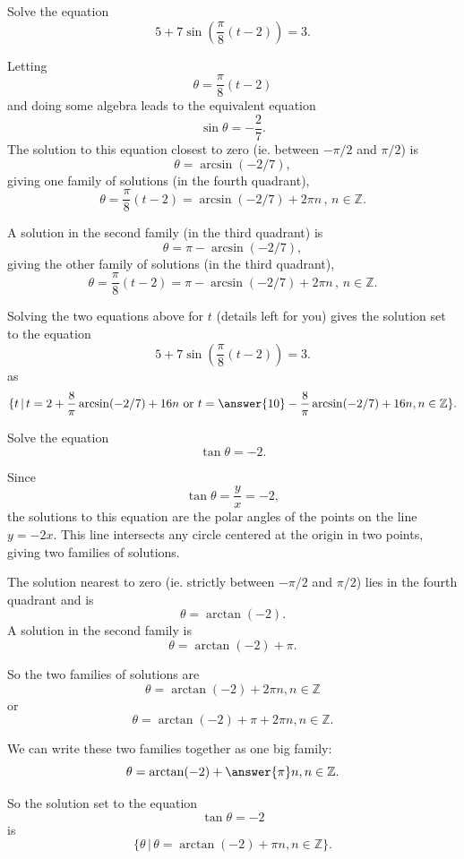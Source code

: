\documentclass{ximera}
\begin{document}
\begin{example} \label{Exlfeef}
Solve the equation
\[
  5 + 7 \sin \left( \frac{\pi}{8}\left( t-2 \right)  \right) =  3 .
\]

\begin{explanation}
Letting 
\[
   \theta = \frac{\pi}{8}\left( t-2 \right)
\]
and doing some algebra leads to the equivalent equation
\[
 \sin\theta = -\frac{2}{7}.
\]
The solution to this equation closest to zero (ie. between $-\pi/2$ and $\pi/2$) is
\[
    \theta = \arcsin(-2/7),
\]
giving one family of solutions (in the fourth quadrant),
\[
  \theta = \frac{\pi}{8}\left( t-2 \right) = \arcsin(-2/7) + 2\pi n \, , \, n \in \mathbb{Z}.
\]

A solution in the second family (in the third quadrant) is
\[
  \theta =  \pi - \arcsin(-2/7),
\]
giving the other family of solutions (in the third quadrant),
\[
  \theta = \frac{\pi}{8}\left( t-2 \right) = \pi - \arcsin(-2/7) + 2\pi n \, , \, n \in \mathbb{Z}.
\]

Solving the two equations above for $t$ (details left for you) gives the solution set to the equation
\[
  5 + 7 \sin \left( \frac{\pi}{8}\left( t-2 \right)  \right) =  3 .
\]
as
\[
     \{  t \, | \, t = 2 + \frac{8}{\pi} \arcsin(-2/7) + 16n  \text{ or } t= \answer{10} - \frac{8}{\pi} \arcsin(-2/7) + 16n ,n\in \mathbb{Z}     \}.
\]
\end{explanation}
\end{example}

\begin{example} \label{Ex93r93r}
Solve the equation
\[
     \tan \theta = -2 .
\]

\begin{explanation}
Since
\[
  \tan\theta = \frac{y}{x} = -2,
\]
the solutions to this equation are the polar angles of the points on the line $y=-2x$. This line intersects any circle centered at the origin in two points, giving two families of solutions. 

The solution nearest to zero (ie. strictly between $-\pi/2$ and $\pi/2$) lies in the fourth quadrant and is
\[
  \theta = \arctan (-2) .
\]
A solution in the second family is
\[
    \theta = \arctan (-2) + \pi .
\]

So the two families of solutions are
\[
  \theta = \arctan (-2)  + 2\pi n , n\in \mathbb{Z}
\]
or
\[
   \theta = \arctan (-2)  + \pi + 2\pi n , n\in \mathbb{Z}.
\]

We can write these two families together as one big family:
\[
  \theta = \arctan(-2) + \answer{\pi} n, n\in \mathbb{Z}.
\]


So the solution set to the equation 
\[
  \tan \theta = -2 
\]
is
\[
  \{ \theta \, | \, \theta = \arctan(-2) + \pi n , n\in \mathbb{Z} \}.
\]
\end{explanation}
\end{example}
\end{document}
